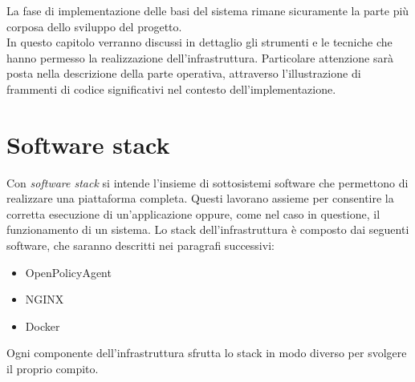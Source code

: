 La fase di implementazione delle basi del sistema rimane sicuramente la parte più corposa dello sviluppo del progetto.
\\ In questo capitolo verranno discussi in dettaglio gli strumenti e le tecniche
che hanno permesso la realizzazione dell'infrastruttura. Particolare attenzione sarà posta nella descrizione 
della parte operativa, attraverso l'illustrazione di frammenti di codice significativi nel contesto dell'implementazione. 

\section{Software stack}
Con \textit{software stack} si intende l'insieme di sottosistemi software che permettono di realizzare una piattaforma completa.
Questi lavorano assieme per consentire la corretta esecuzione di un'applicazione oppure, come nel caso in questione, il 
funzionamento di un sistema.
Lo stack dell'infrastruttura è composto dai seguenti software, che saranno descritti nei paragrafi successivi:
\begin{itemize}
    \item OpenPolicyAgent
    \item NGINX
    \item Docker
\end{itemize}
Ogni componente dell'infrastruttura sfrutta lo stack in modo diverso per svolgere il proprio compito. 


